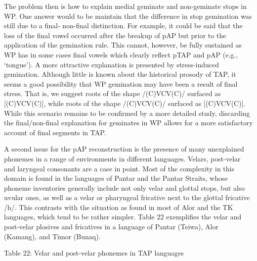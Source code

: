 The problem then is how to explain medial geminate and non-geminate stops in WP. One answer would to be maintain that the difference in stop gemination was still due to a final- non-final distinction. For example, it could be said that the loss of the final vowel occurred after the breakup of pAP but prior to the application of the gemination rule. This cannot, however, be fully sustained as WP has in some cases final vowels which clearly reflect pTAP and pAP (e.g., {\textquoteleft}tongue{\textquoteright}). A more attractive explanation is presented by stress-induced gemination. Although little is known about the historical prosody of TAP, it seems a good possibility that WP gemination may have been a result of final stress. That is, we suggest roots of the shape /(C)V{\textprimstress}CV(C)/ surfaced as [(C)V{\textprimstress}C{\textlengthmark}V(C)], while roots of the shape /{\textprimstress}(C)VCV(C)/ surfaced as [{\textprimstress}(C)VCV(C)]. While this scenario remains to be confirmed by a more detailed 
study, discarding the final/non-final explanation for geminates in WP allows for a more satisfactory account of final segments in TAP.

A second issue for the pAP reconstruction is the presence of many unexplained phonemes in a range of environments in different languages. Velars, post-velar and laryngeal consonants are a case in point. Most of the complexity in this domain is found in the languages of Pantar and the Pantar Straits, whose phoneme inventories generally include not only velar and glottal stops, but also uvular ones, as well as a velar or pharyngeal fricative next to the glottal fricative /h/. This contrasts with the situation as found in most of Alor and the TK languages, which tend to be rather simpler. Table 22 exemplifies the velar and post-velar plosives and fricatives in a language of Pantar (Teiwa), Alor (Kamang), and Timor (Bunaq).

{\centering
Table 22: Velar and post-velar phonemes in TAP languages
\par}

